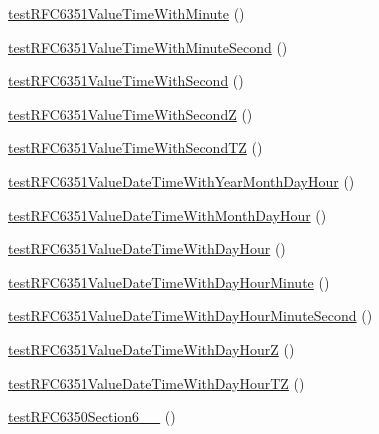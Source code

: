 \begin{DoxyCompactItemize}
\mbox{\hyperlink{class_sabre_1_1_v_object_1_1_parser_1_1_xml_test_a263d52e4fe6220d6371c9e647bd79e14}{test\+R\+F\+C6351\+Value\+Time\+With\+Minute}} ()
\item 
\mbox{\hyperlink{class_sabre_1_1_v_object_1_1_parser_1_1_xml_test_a10b07089a634926b3a521b4865861c15}{test\+R\+F\+C6351\+Value\+Time\+With\+Minute\+Second}} ()
\item 
\mbox{\hyperlink{class_sabre_1_1_v_object_1_1_parser_1_1_xml_test_a8fc5dca34904b78d643b47ae17a26aa5}{test\+R\+F\+C6351\+Value\+Time\+With\+Second}} ()
\item 
\mbox{\hyperlink{class_sabre_1_1_v_object_1_1_parser_1_1_xml_test_a607d97acf898c965f0cb4aecf17c5555}{test\+R\+F\+C6351\+Value\+Time\+With\+SecondZ}} ()
\item 
\mbox{\hyperlink{class_sabre_1_1_v_object_1_1_parser_1_1_xml_test_a989366f1308ad4b4dc365a12e8174771}{test\+R\+F\+C6351\+Value\+Time\+With\+Second\+TZ}} ()
\item 
\mbox{\hyperlink{class_sabre_1_1_v_object_1_1_parser_1_1_xml_test_a2478b073e2fea566c6a90ada5f0a7ccb}{test\+R\+F\+C6351\+Value\+Date\+Time\+With\+Year\+Month\+Day\+Hour}} ()
\item 
\mbox{\hyperlink{class_sabre_1_1_v_object_1_1_parser_1_1_xml_test_ad490a1bb971870bce933304f0c9e20d8}{test\+R\+F\+C6351\+Value\+Date\+Time\+With\+Month\+Day\+Hour}} ()
\item 
\mbox{\hyperlink{class_sabre_1_1_v_object_1_1_parser_1_1_xml_test_a3e4bed4d4146aeb11a0ab6a284605b45}{test\+R\+F\+C6351\+Value\+Date\+Time\+With\+Day\+Hour}} ()
\item 
\mbox{\hyperlink{class_sabre_1_1_v_object_1_1_parser_1_1_xml_test_ae27313057c1d0f1170eeb2b6736dde2b}{test\+R\+F\+C6351\+Value\+Date\+Time\+With\+Day\+Hour\+Minute}} ()
\item 
\mbox{\hyperlink{class_sabre_1_1_v_object_1_1_parser_1_1_xml_test_a550d2e7f6c100e821b20ef617081c34e}{test\+R\+F\+C6351\+Value\+Date\+Time\+With\+Day\+Hour\+Minute\+Second}} ()
\item 
\mbox{\hyperlink{class_sabre_1_1_v_object_1_1_parser_1_1_xml_test_af79746c933464820b2ce35a7172f4ad8}{test\+R\+F\+C6351\+Value\+Date\+Time\+With\+Day\+HourZ}} ()
\item 
\mbox{\hyperlink{class_sabre_1_1_v_object_1_1_parser_1_1_xml_test_a468ca6cb63c19cb01ce1066d9e3b4da8}{test\+R\+F\+C6351\+Value\+Date\+Time\+With\+Day\+Hour\+TZ}} ()
\item 
\mbox{\hyperlink{class_sabre_1_1_v_object_1_1_parser_1_1_xml_test_adbad07800c7ab41ed0784a28c8676011}{test\+R\+F\+C6350\+Section6\+\_\+\_}} ()

\end{DoxyCompactItemize}
